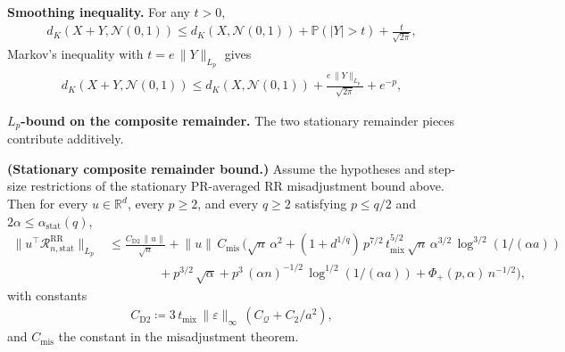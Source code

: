 \textbf{Smoothing inequality.} For any \(t > 0\),
\begin{equation}
\begin{aligned}
d_K (X + Y, \mathcal{N}(0, 1))
  \le d_K (X, \mathcal{N}(0, 1))
   + \mathbb{P}(|Y| > t)
   + \frac{t}{\sqrt{2 \pi}},
\end{aligned}
\label{eq:smoothing}
\end{equation}
Markov's inequality with \(t = e \, \lVert Y \rVert_{L_p}\) gives
\begin{equation}
\begin{aligned}
d_K (X + Y, \mathcal{N}(0, 1))
  \le d_K (X, \mathcal{N}(0, 1))
   + \frac{e \, \lVert  Y  \rVert_{L_p}}{\sqrt{2 \pi}}
   + e^{-p},
\end{aligned}
\label{eq:smoothing-Lp}
\end{equation}

\textbf{\(L_p\)-bound on the composite remainder.} The two stationary remainder pieces
contribute additively.

\begin{lemma}\label{lem:R-bound}
  \textbf{(Stationary composite remainder bound.)}
  Assume the hypotheses and step-size restrictions of the stationary
  PR-averaged RR misadjustment bound above. Then for every \(u \in \mathbb{R}^d\),
  every \(p \ge 2\), and every \(q \ge 2\) satisfying \(p \le q / 2\) and
  \(2 \alpha \le \alpha_{\text{stat}}(q)\),
\begin{equation}
\begin{aligned}
  \lVert  u^\top \mathcal{R}_{n, \text{stat}}^{\text{RR}}  \rVert_{L_p}
    &\le \frac{C_{\text{D2}} \, \lVert  u  \rVert}{\sqrt{n}}
     + \lVert  u  \rVert \, C_{\text{mis}} \, \Biggl(
        \sqrt{n} \, \alpha^2
        + (1 + d^{1 / q}) \, p^{7 / 2} \, t_{\text{mix}}^{5 / 2}
            \, \sqrt{n} \, \alpha^{3 / 2} \, \log^{3 / 2}(1 / (\alpha a))
      \\
        & \quad \quad \quad \quad
        + p^{3 / 2} \, \sqrt{\alpha}
        + p^3 \, (\alpha n)^{-1 / 2} \, \log^{1 / 2}(1 / (\alpha a))
        + \Phi_+(p, \alpha) \, n^{-1 / 2}
      \Biggr),
\end{aligned}
\end{equation}
  with constants
\begin{equation}
\begin{aligned}
  C_{\text{D2}} \coloneqq 3 \, t_{\text{mix}} \, \lVert  \varepsilon  \rVert_\infty
              \, (C_{\mathcal{Q}} + C_2 / a^2),
\end{aligned}
\end{equation}
  and \(C_{\text{mis}}\) the constant in the misadjustment theorem.
\end{lemma}

